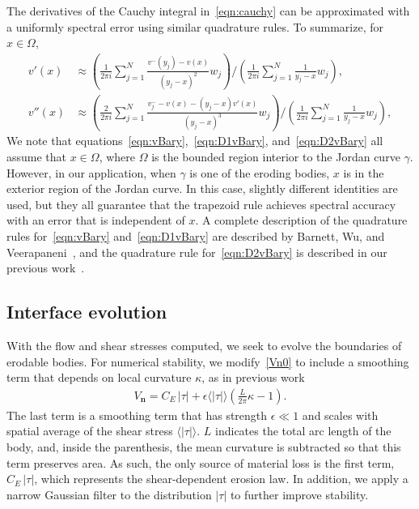 \documentclass[3p]{elsarticle}
\newcommand{\nn}{{\mathbf{n}}}
\newcommand{\abs}[1]{\left| #1 \right|}
\newcommand{\Vn}{V_\nn}
\newcommand{\CE}{C_E}
\begin{document}
The derivatives of the Cauchy integral in~\eqref{eqn:cauchy} can be
approximated with a uniformly spectral error using similar quadrature
rules. To summarize, for $x \in \Omega$, 
\begin{align}
  v'(x) &\approx \left(\frac{1}{2\pi i}\sum_{j=1}^{N}
    \frac{v^{-}(y_j) - v(x)}{(y_j-x)^2} w_j \right)
  \Bigg/
  \left(\frac{1}{2\pi i}\sum_{j=1}^{N} \frac{1}{y_j-x} w_j\right), 
  \label{eqn:D1vBary} \\
  v''(x) &\approx \left(\frac{2}{2\pi i}\sum_{j=1}^N 
    \frac{v^{-}_{j} - v(x) - (y_j-x)v'(x)}{(y_j-x)^3}w_j \right)
    \Bigg/
    \left(\frac{1}{2\pi i}\sum_{j=1}^N \frac{1}{y_j-x}w_j\right),
  \label{eqn:D2vBary}
\end{align}
We note that equations~\eqref{eqn:vBary},~\eqref{eqn:D1vBary},
and~\eqref{eqn:D2vBary} all assume that $x \in \Omega$, where $\Omega$
is the bounded region interior to the Jordan curve $\gamma$. However, in
our application, when $\gamma$ is one of the eroding bodies, $x$ is in
the exterior region of the Jordan curve. In this case, slightly
different identities are used, but they all guarantee that the trapezoid
rule achieves spectral accuracy with an error that is independent of
$x$. A complete description of the quadrature rules
for~\eqref{eqn:vBary} and~\eqref{eqn:D1vBary} are described by Barnett,
Wu, and Veerapaneni~\cite{bar-wu-vee2015}, and the quadrature rule
for~\eqref{eqn:D2vBary} is described in our previous
work~\cite{chiu2020viscous}.




\subsection{Interface evolution}

With the flow and shear stresses computed, we seek to evolve the boundaries of erodable bodies. For numerical stability, we modify~\eqref{Vn0} to include a smoothing term that depends on local curvature $\kappa$, as in previous work~\cite{quaife2018boundary}
\begin{align}
  \Vn = \CE \, \abs{\tau} + \epsilon \langle\abs{\tau}\rangle \left(
    \frac{L}{2\pi} \kappa - 1 \right).
\end{align}
The last term is a smoothing term that has strength $\epsilon \ll 1$ and scales with spatial average of the shear stress $\langle\abs{\tau}\rangle$. $L$ indicates the total arc length of the body, and, inside the parenthesis, the mean curvature is subtracted so that this term preserves area. As such, the only source of material loss is the first term, $\CE \, \abs{\tau}$, which represents the shear-dependent erosion law. In addition, we apply a narrow Gaussian filter to the distribution $\abs{\tau}$ to further improve stability.
\end{document}
